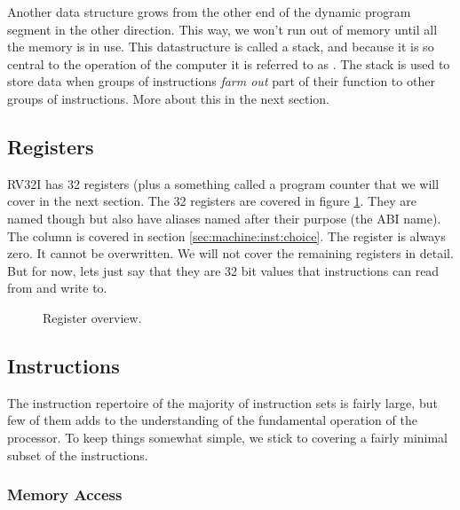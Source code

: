 Another data structure grows from the other end of the dynamic program segment in the other direction. This way, we won't run out of memory until all the memory is in use. This datastructure is called a stack, and because it is so central to the operation of the computer it is referred to as . The stack is used to store data when groups of instructions \textsl{farm out} part of their function to other groups of instructions. More about this in the next section.

\subsection{Registers}

RV32I has 32 registers (plus a something called a program counter that we will cover in the next section. The 32 registers are covered in figure \ref{fig:machine:regs}. They are named  though  but also have aliases named after their purpose (the ABI name). The  column is covered in section \ref{sec:machine:inst:choice}. The  register is always zero. It cannot be overwritten. We will not cover the remaining registers in detail. But for now, lets just say that they are 32 bit values that instructions can read from and write to. %

\begin{figure}[tbp]
  
  \caption{Register overview.}
  \label{fig:machine:regs}
\end{figure}

\subsection{Instructions}

The instruction repertoire of the majority of instruction sets is fairly large, but few of them adds to the understanding of the fundamental operation of the processor. To keep things somewhat simple, we stick to covering a fairly minimal subset of the instructions.


\subsubsection{Memory Access}


